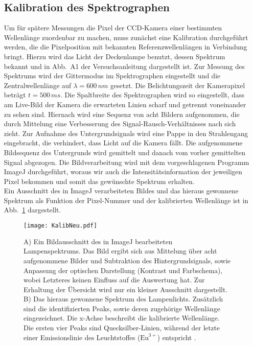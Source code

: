 \subsection{\label{subsec:A1}Kalibration des Spektrographen}
Um für spätere Messungen die Pixel der CCD-Kamera einer bestimmten Wellenlänge zuordenbar zu machen, 
muss zunächst eine Kalibration durchgeführt werden, die die Pixelposition mit bekannten 
Referenzwellenlängen in Verbindung bringt. Hierzu wird das Licht der Deckenlampe benutzt, 
dessen Spektrum bekannt und in Abb.~A1 der Versuchsanleitung dargestellt ist.
Zur Messung des Spektrums wird der Gittermodus im Spektrographen eingestellt und die Zentralwellenlänge auf 
$\lambda = 600\,\si{nm}$ gesetzt. Die Belichtungszeit der Kamerapixel beträgt $t = 500\,\si{ms}$. 
Die Spaltbreite des Spektrographen wird so eingestellt, dass am Live-Bild der Kamera die erwarteten Linien
scharf und getrennt voneinander zu sehen sind. Hiernach wird eine Sequenz von acht Bildern aufgenommen, die 
durch Mittelung eine Verbesserung des Signal-Rausch-Verhältnisses nach sich zieht. Zur Aufnahme des Untergrundsignals 
wird eine Pappe in den Strahlengang eingebracht, die verhindert, dass Licht auf die Kamera fällt. 
Die aufgenommene Bildsequenz des Untergrunds wird gemittelt und danach vom vorher gemittelten Signal 
abgezogen. 
Die Bildverarbeitung wird mit dem vorgeschlagenen Programm ImageJ durchgeführt, woraus wir 
auch die Intensitätsinformation der jeweiligen Pixel bekommen und somit das gewünschte Spektrum 
erhalten. \\ 
Ein Ausschnitt des in ImageJ verarbeiteten Bildes 
und das hieraus gewonnene Spektrum als Funktion der Pixel-Nummer 
und der kalibrierten Wellenlänge ist in Abb.~\ref{fig:kalib} dargestellt.
\begin{figure}[h!]
    \centering
    \texttt{[image: KalibNeu.pdf]}
    \caption{\label{fig:kalib}A) Ein Bildausschnitt des in ImageJ bearbeiteten Lampenspektrums. Das Bild ergibt sich aus 
    Mittelung über acht aufgenommene Bilder und Subtraktion des Hintergrundsignals, sowie Anpassung der optischen Darstellung 
    (Kontrast und Farbschema), wobei Letzteres keinen Einfluss auf die Auswertung hat. Zur Erhaltung der Übersicht wird nur ein 
    kleiner Ausschnitt dargestellt. 
    B) Das hieraus gewonnene Spektrum des Lampenlichts. Zusätzlich sind die identifizierten Peaks, sowie deren zugehörige 
    Wellenlänge eingezeichnet. Die x-Achse beschreibt die kalibrierte Wellenlänge. Die ersten vier Peaks sind 
    Quecksilber-Linien, während der letzte einer Emissionslinie des Leuchtstoffes ($\text{Eu}^{3+}$) entspricht \cite{Anleitung}.}
\end{figure}\FloatBarrier
